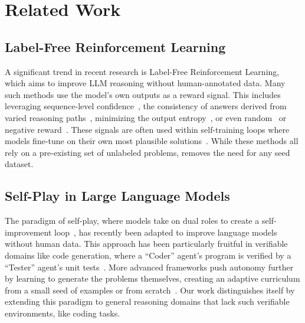 \section{Related Work}
\label{sec:related_work}
\subsection{Label-Free Reinforcement Learning}

A significant trend in recent research is Label-Free Reinforcement Learning, which aims to improve LLM reasoning without human-annotated data. Many such methods use the model's own outputs as a reward signal. This includes leveraging sequence-level confidence~\citep{Li2025ConfidenceIA, Prabhudesai2025MaximizingCA}, the consistency of answers derived from varied reasoning paths~\citep{Zhang2025ConsistentPL, Zuo2025TTRLTR, Zhang2025RightQI,zhou2025evolving,prasad2024self}, minimizing the output entropy~\citep{Agarwal2025TheUE, Cheng2025ReasoningWE}, or even random~\citep{shao2025spuriousrewardsrethinkingtraining} or negative reward~\citep{Zhu2025TheSE}. These signals are often used within self-training loops where models fine-tune on their own most plausible solutions~\citep{Shafayat2025CanLR, Zhao2025LearningTR}. While these methods all rely on a pre-existing set of unlabeled problems, \method{} removes the need for any seed dataset.
\subsection{Self-Play in Large Language Models}
\label{sec:related_work_self_play}

The paradigm of self-play, where models take on dual roles to create a self-improvement loop~\citep{chen2024self,zhang2024survey}, has recently been adapted to improve language models without human data. This approach has been particularly fruitful in verifiable domains like code generation, where a ``Coder'' agent's program is verified by a ``Tester'' agent's unit tests~\citep{Lin2025LearningTS, Wang2025CoEvolvingLC, Pourcel2025SelfImprovingLM,jiang2025verse}. More advanced frameworks push autonomy further by learning to generate the problems themselves, creating an adaptive curriculum from a small seed of examples or from scratch~\citep{Zhao2025AbsoluteZR, li2025videohalluevaluatingmitigatingmultimodal,Zhou2025SelfChallengingLM, Fang2025SeRLSR}. Our work distinguishes itself by extending this paradigm to general reasoning domains that lack such verifiable environments, like coding tasks.

